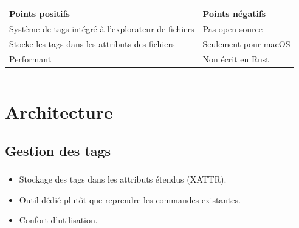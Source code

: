 \documentclass[10pt]{beamer}
\begin{document}
\begin{frame}
\begin{columns}[T]
\begin{column}{.6\textwidth}
\begin{center}
\begin{tabularx}{6cm}{|X|X|}
                    \textbf{Points positifs} & \textbf{Points négatifs} \\ \hline
                    Système de tags intégré à l'explorateur de fichiers & Pas open source \\ \hline
                    Stocke les tags dans les attributs des fichiers & Seulement pour macOS \\ \hline
                    Performant & Non écrit en Rust \\ \hline
                \end{tabularx}
            \end{center}
        \end{column}
    \end{columns}
\end{frame}

\section{Architecture}
\subsection{Gestion des tags}
\begin{frame}
    \frametitle{\subsecname}
    \begin{itemize}
        \item Stockage des tags dans les attributs étendus (XATTR).
        \item Outil dédié plutôt que reprendre les commandes existantes.
        \item Confort d'utilisation.
    \end{itemize}
\end{frame}
\end{document}
